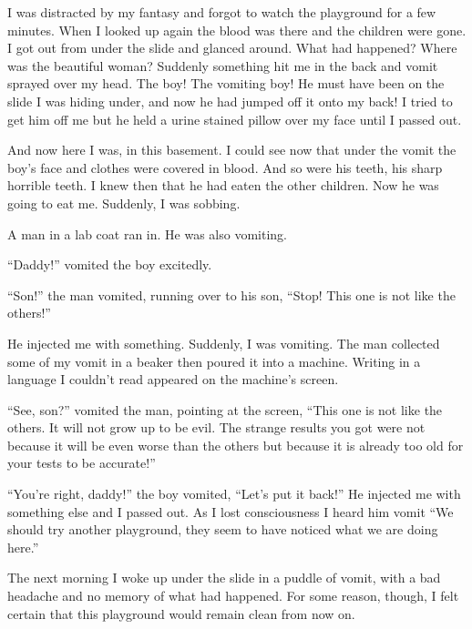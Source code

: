I was distracted by my fantasy and forgot to watch the playground
for a few minutes. When I looked up again the blood was there and
the children were gone. I got out from under the slide and glanced
around. What had happened? Where was the beautiful woman? Suddenly
something hit me in the back and vomit sprayed over my head. The
boy! The vomiting boy! He must have been on the slide I was hiding
under, and now he had jumped off it onto my back! I tried to get
him off me but he held a urine stained pillow over my face until I
passed out.



And now here I was, in this basement. I could see now that under
the vomit the boy's face and clothes were covered in blood.
And so were his teeth, his sharp horrible teeth. I knew then that
he had eaten the other children. Now he was going to eat me.
Suddenly, I was sobbing.



A man in a lab coat ran in. He was also vomiting.



``Daddy!'' vomited the boy excitedly.



``Son!'' the man vomited, running over to his son,
``Stop! This one is not like the others!''



He injected me with something. Suddenly, I was vomiting. The man
collected some of my vomit in a beaker then poured it into a
machine. Writing in a language I couldn't read appeared on
the machine's screen.



``See, son?'' vomited the man, pointing at the screen,
``This one is not like the others. It will not grow up to be
evil. The strange results you got were not because it will be even
worse than the others but because it is already too old for your
tests to be accurate!''



``You're right, daddy!'' the boy vomited,
``Let's put it back!'' He injected me with
something else and I passed out. As I lost consciousness I heard
him vomit ``We should try another playground, they seem to
have noticed what we are doing here.''



The next morning I woke up under the slide in a puddle of vomit,
with a bad headache and no memory of what had happened. For some
reason, though, I felt certain that this playground would remain
clean from now on. 
 



